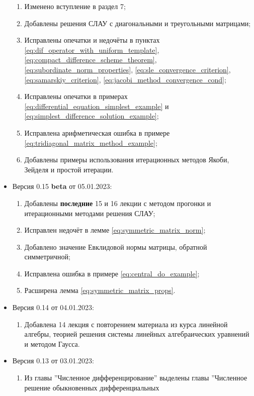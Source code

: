 \documentclass{article}
\begin{document}
\begin{itemize}[nosep]
	\begin{enumerate}[nosep]
		\item Изменено вступление в раздел 7;
		\item Добавлены решения СЛАУ с диагональными и треугольными
			матрицами;
		\item Исправлены опечатки и недочёты в пунктах
			\eqref{eq:dif_operator_with_uniform_template},
			\eqref{eq:compact_difference_scheme_theorem},
			\eqref{eq:subordinate_norm_properties},
			\eqref{eq:sle_convergence_criterion},
			\eqref{eq:samarskiy_criterion},
			\eqref{eq:jacobi_method_convergence_cond};
		\item Исправлены опечатки в примерах
			\eqref{eq:differential_equation_simplest_example} и
			\eqref{eq:simplest_difference_solution_example};
		\item Исправлена арифметическая ошибка в примере
			\eqref{eq:tridiagonal_matrix_method_example};
		\item Добавлены примеры использования итерационных методов
			Якоби, Зейделя и простой итерации.
	\end{enumerate}
\item Версия 0.15 \textbf{beta} от 05.01.2023:
	\begin{enumerate}[nosep]
		\item Добавлены \textbf{последние} 15 и 16 лекции с методом
			прогонки и итерационными методами решения СЛАУ;
		\item Исправлен недочёт в лемме
			\eqref{eq:symmetric_matrix_norm};
		\item Добавлено значение Евклидовой нормы матрицы, обратной
			симметричной;
		\item Исправлена ошибка в примере \eqref{eq:central_do_example};
		\item Расширена лемма \eqref{eq:symmetric_matrix_props}.
	\end{enumerate}
\item Версия 0.14 от 04.01.2023:
	\begin{enumerate}[nosep]
		\item Добавлена 14 лекция с повторением материала из курса
			линейной алгебры, теорией решения системы линейных
			алгебраических уравнений и методом Гаусса.
	\end{enumerate}
\item Версия 0.13 от 03.01.2023:
	\begin{enumerate}[nosep]
		\item Из главы ''Численное дифференцирование'' выделены главы
			''Численное решение обыкновенных дифференциальных

\end{enumerate}
\end{itemize}
\end{document}
